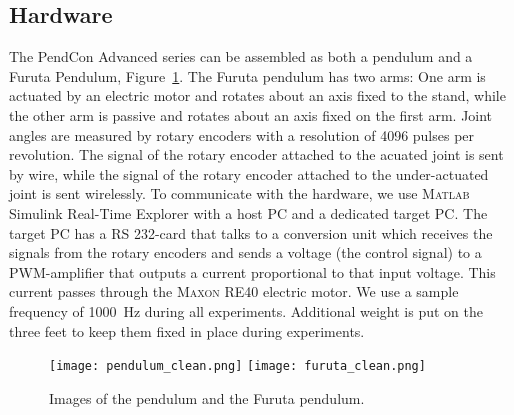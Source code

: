 \documentclass[preprint,12pt]{elsarticle}
\newcommand\figref{Figure~\ref}
\numberwithin{equation}{section}
\begin{document}
\subsection{Hardware}
The PendCon Advanced series can be assembled as both a pendulum and a Furuta Pendulum, \figref{fig:furuta_images}.
The Furuta pendulum has two arms:
One arm is actuated by an electric motor and rotates about an axis fixed to the stand, while the other arm is passive and rotates about an axis fixed on the first arm.
Joint angles are measured by rotary encoders with a resolution of 4096 pulses per revolution.
The signal of the rotary encoder attached to the acuated joint is sent by wire, while the signal of the rotary encoder attached to the under-actuated joint is sent wirelessly.
To communicate with the hardware, we use \textsc{Matlab} Simulink Real-Time Explorer with a host PC and a dedicated target PC.
The target PC has a RS 232-card that talks to a conversion unit which receives the signals from the rotary encoders and sends a voltage (the control signal) to a PWM-amplifier that outputs a current proportional to that input voltage.
This current passes through the \textsc{Maxon} RE40 electric motor. We use a sample frequency of \SI{1000}{Hz} during all experiments.
Additional weight is put on the three feet to keep them fixed in place during experiments.
\begin{figure}
    \centering
    \texttt{[image: pendulum\_clean.png]}
    \texttt{[image: furuta\_clean.png]}
    \caption{Images of the pendulum and the Furuta pendulum.}
    \label{fig:furuta_images}
\end{figure}
\end{document}

